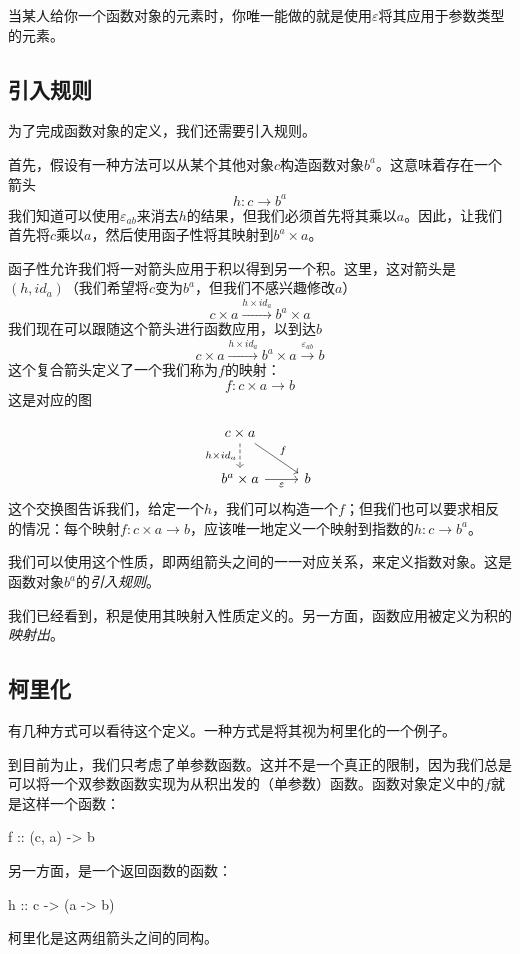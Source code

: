 \documentclass[DaoFP]{subfiles}
\begin{document}
当某人给你一个函数对象的元素时，你唯一能做的就是使用$\varepsilon$将其应用于参数类型的元素。

\subsection{引入规则}
为了完成函数对象的定义，我们还需要引入规则。

首先，假设有一种方法可以从某个其他对象$c$构造函数对象$b^a$。这意味着存在一个箭头
\[h \colon c \to b^a\]
我们知道可以使用$\varepsilon_{a b}$来消去$h$的结果，但我们必须首先将其乘以$a$。因此，让我们首先将$c$乘以$a$，然后使用函子性将其映射到$b^a \times a$。

函子性允许我们将一对箭头应用于积以得到另一个积。这里，这对箭头是$(h, id_a)$（我们希望将$c$变为$b^a$，但我们不感兴趣修改$a$）
\[ c \times a \xrightarrow{h \times id_a} b^a \times a \]
我们现在可以跟随这个箭头进行函数应用，以到达$b$
\[ c \times a \xrightarrow{h \times id_a} b^a \times a \xrightarrow{\varepsilon_{a b}} b\]
这个复合箭头定义了一个我们称为$f$的映射：
\[f \colon c \times a \to b\]
这是对应的图

\[
 \begin{tikzcd}
 c \times a
 \arrow[d, dashed, "h \times id_a"']
 \arrow[rd, "f"]
 \\
 b^a \times a
 \arrow[r, "\varepsilon"']
& b
 \end{tikzcd}
\]
这个交换图告诉我们，给定一个$h$，我们可以构造一个$f$；但我们也可以要求相反的情况：每个映射$f \colon c \times a \to b$，应该唯一地定义一个映射到指数的$h \colon c \to b^a$。

我们可以使用这个性质，即两组箭头之间的一一对应关系，来定义指数对象。这是函数对象$b^a$的\emph{引入规则}。

我们已经看到，积是使用其映射入性质定义的。另一方面，函数应用被定义为积的\emph{映射出}。

\subsection{柯里化}

有几种方式可以看待这个定义。一种方式是将其视为柯里化的一个例子。

到目前为止，我们只考虑了单参数函数。这并不是一个真正的限制，因为我们总是可以将一个双参数函数实现为从积出发的（单参数）函数。函数对象定义中的$f$就是这样一个函数：
\begin{haskell}
f :: (c, a) -> b
\end{haskell}
另一方面，是一个返回函数的函数：
\begin{haskell}
h :: c -> (a -> b)
\end{haskell}
柯里化是这两组箭头之间的同构。
\end{document}

